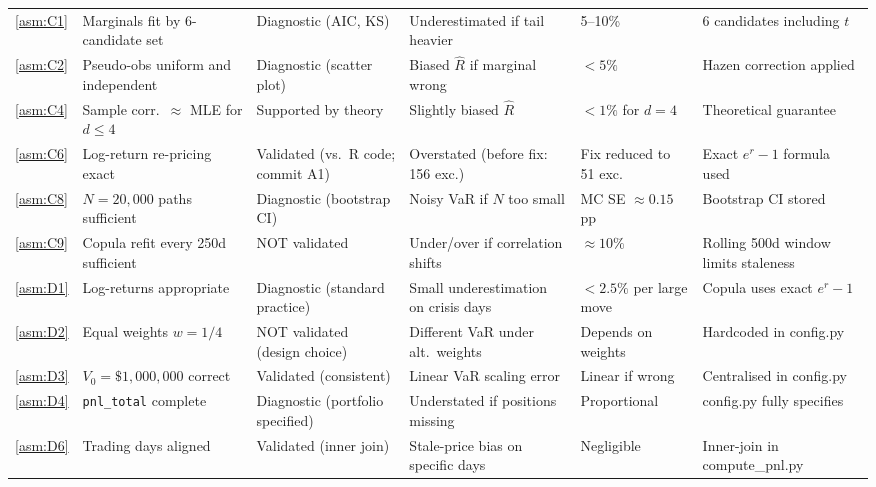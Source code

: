 \documentclass[11pt,a4paper]{article}
\newcommand{\code}[1]{\texttt{#1}}
\begin{document}
\begin{footnotesize}
\begin{longtable}{@{}p{0.65cm} p{4.0cm} p{2.6cm} p{3.4cm} p{2.0cm} p{2.8cm}@{}}
\cref{asm:C1}  & Marginals fit by 6-candidate set & Diagnostic (AIC, KS) & Underestimated if tail heavier & 5--10\% & 6 candidates including $t$ \\[4pt]

\cref{asm:C2}  & Pseudo-obs uniform and independent & Diagnostic (scatter plot) & Biased $\hat{R}$ if marginal wrong & $<5\%$ & Hazen correction applied \\[4pt]

\cref{asm:C4}  & Sample corr.\ $\approx$ MLE for $d\le4$ & Supported by theory & Slightly biased $\hat{R}$ & $<1\%$ for $d=4$ & Theoretical guarantee \\[4pt]

\cref{asm:C6}  & Log-return re-pricing exact & Validated (vs.\ R code; commit A1) & Overstated (before fix: 156 exc.) & Fix reduced to 51 exc. & Exact $e^r-1$ formula used \\[4pt]

\cref{asm:C8}  & $N=20{,}000$ paths sufficient & Diagnostic (bootstrap CI) & Noisy VaR if $N$ too small & MC SE $\approx 0.15$ pp & Bootstrap CI stored \\[4pt]

\cref{asm:C9}  & Copula refit every 250d sufficient & NOT validated & Under/over if correlation shifts & $\approx 10\%$ & Rolling 500d window limits staleness \\[4pt]

\cref{asm:D1}  & Log-returns appropriate & Diagnostic (standard practice) & Small underestimation on crisis days & $<2.5\%$ per large move & Copula uses exact $e^r-1$ \\[4pt]

\cref{asm:D2}  & Equal weights $w=1/4$ & NOT validated (design choice) & Different VaR under alt.\ weights & Depends on weights & Hardcoded in config.py \\[4pt]

\cref{asm:D3}  & $V_0=\$1{,}000{,}000$ correct & Validated (consistent) & Linear VaR scaling error & Linear if wrong & Centralised in config.py \\[4pt]

\cref{asm:D4}  & \code{pnl\_total} complete & Diagnostic (portfolio specified) & Understated if positions missing & Proportional & config.py fully specifies \\[4pt]

\cref{asm:D6}  & Trading days aligned & Validated (inner join) & Stale-price bias on specific days & Negligible & Inner-join in compute\_pnl.py \\[4pt]


\end{longtable}
\end{footnotesize}
\end{document}
